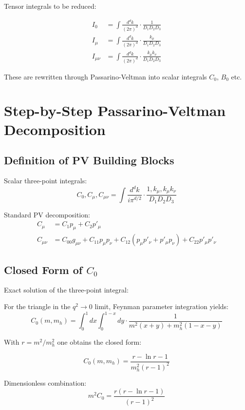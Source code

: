 	Tensor integrals to be reduced:
	
	\begin{align}
		I_0 &= \int \frac{d^d k}{(2\pi)^d} \cdot \frac{1}{D_1 D_2 D_3}\\
		I_\mu &= \int \frac{d^d k}{(2\pi)^d} \cdot \frac{k_\mu}{D_1 D_2 D_3}\\
		I_{\mu\nu} &= \int \frac{d^d k}{(2\pi)^d} \cdot \frac{k_\mu k_\nu}{D_1 D_2 D_3}
	\end{align}
	
	These are rewritten through Passarino-Veltman into scalar integrals $C_0$, $B_0$ etc.
	
	\section{Step-by-Step Passarino-Veltman Decomposition}
	
	\subsection{Definition of PV Building Blocks}
	
	\begin{pvbox}
		Scalar three-point integrals:
		\begin{equation}
			C_0, C_\mu, C_{\mu\nu} = \int \frac{d^d k}{i\pi^{d/2}} \cdot \frac{1, k_\mu, k_\mu k_\nu}{D_1 D_2 D_3}
		\end{equation}
		
		Standard PV decomposition:
		\begin{align}
			C_\mu &= C_1 p_\mu + C_2 p'_\mu\\
			C_{\mu\nu} &= C_{00} g_{\mu\nu} + C_{11} p_\mu p_\nu + C_{12}(p_\mu p'_\nu + p'_\mu p_\nu) + C_{22} p'_\mu p'_\nu
		\end{align}
	\end{pvbox}
	
	\subsection{Closed Form of $C_0$}
	
	\begin{pvbox}
		Exact solution of the three-point integral:
		
		For the triangle in the $q^2 \to 0$ limit, Feynman parameter integration yields:
		\begin{equation}
			C_0(m, m_h) = \int_0^1 dx \int_0^{1-x} dy \cdot \frac{1}{m^2(x+y) + m_h^2(1-x-y)}
		\end{equation}
		
		With $r = m^2/m_h^2$ one obtains the closed form:
		
		\begin{equation}
			C_0(m, m_h) = \frac{r - \ln r - 1}{m_h^2(r-1)^2}
		\end{equation}
		
		Dimensionless combination:
		\begin{equation}
			m^2C_0 = \frac{r(r - \ln r - 1)}{(r-1)^2}
		\end{equation}
	\end{pvbox}
	
